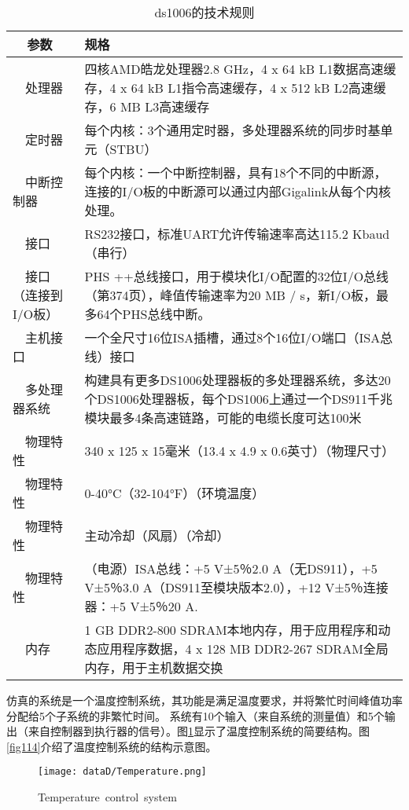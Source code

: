 \begin{table}[!htb]
\caption {ds1006的技术规则}
\label{algo:dspace}
\begin{tabular} {|p{4cm}|p{10cm}|} \hline \hline
  参数&规格\\ \hline
  处理器&四核AMD皓龙处理器2.8 GHz，4 x 64 kB L1数据高速缓存，4 x 64 kB L1指令高速缓存，4 x 512 kB L2高速缓存，6 MB L3高速缓存\\ \hline
  定时器&每个内核：3个通用定时器，多处理器系统的同步时基单元（STBU）\\ \hline
  中断控制器&每个内核：一个中断控制器，具有18个不同的中断源，连接的I/O板的中断源可以通过内部Gigalink从每个内核处理。 \\ \hline

  接口&RS232接口，标准UART允许传输速率高达115.2 Kbaud（串行）\\ \hline
  接口（连接到I/O板）&PHS ++总线接口，用于模块化I/O配置的32位I/O总线（第374页），峰值传输速率为20 MB / s，新I/O板，最多64个PHS总线中断。 \\ \hline

  主机接口&一个全尺寸16位ISA插槽，通过8个16位I/O端口（ISA总线）接口\\ \hline

  多处理器系统&构建具有更多DS1006处理器板的多处理器系统，多达20个DS1006处理器板，每个DS1006上通过一个DS911千兆模块最多4条高速链路，可能的电缆长度可达100米\\ \hline

  物理特性&340 x 125 x 15毫米（13.4 x 4.9 x 0.6英寸）（物理尺寸）\\ \hline
  物理特性&0-40°C（32-104°F）（环境温度）\\ \hline
  物理特性&主动冷却（风扇）（冷却）\\ \hline
  物理特性&（电源）ISA总线：+5 V±5％2.0 A（无DS911），+5 V±5％3.0 A（DS911至模块版本2.0），+12 V±5％连接器：+5 V±5％20 A. \\ \hline
  内存&1 GB DDR2-800 SDRAM本地内存，用于应用程序和动态应用程序数据，4 x 128 MB DDR2-267 SDRAM全局内存，用于主机数据交换\\ \hline\hline
\end{tabular}
\end{table}

仿真的系统是一个温度控制系统，其功能是满足温度要求，并将繁忙时间峰值功率分配给5个子系统的非繁忙时间。 系统有10个输入（来自系统的测量值）和5个输出（来自控制器到执行器的信号）。图\ref{fig113}显示了温度控制系统的简要结构。图\ref {fig114}介绍了温度控制系统的结构示意图。
	
	\begin{figure}[!htb]
		\centering
		\texttt{[image: dataD/Temperature.png]}
		\caption{Temperature control system}
		\label{fig113}
	\end{figure}
	
